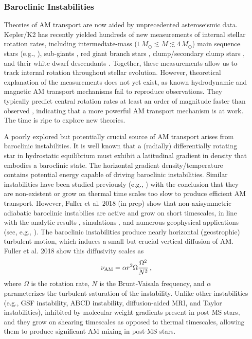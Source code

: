 \subsubsection{Baroclinic Instabilities}
\label{baroclinic}


Theories of AM transport are now aided by unprecedented asteroseismic data. Kepler/K2 has recently yielded hundreds of new measurements of internal stellar rotation rates, including intermediate-mass ($1 \, M_\odot \! \lesssim \! M \! \lesssim \! 4 \, M_\odot$) main sequence stars (e.g., \citealt{benomar:15,vanreeth:16}), sub-giants \citep{deheuvels:14}, red giant branch stars \citep{beck:12,mosser:12}, clump/secondary clump stars \citep{mosser:12,deheuvels:15}, and their white dwarf descendants \citep{hermes:17}. Together, these measurements allow us to track internal rotation throughout stellar evolution. However, theoretical explanation of the measurements does not yet exist, as known hydrodynamic and magnetic AM transport mechanisms fail to reproduce observations. They typically predict central rotation rates at least an order of magnitude faster than observed \citep{cantiello:14}, indicating that a more powerful AM transport mechanism is at work. The time is ripe to explore new theories.

A poorly explored but potentially crucial source of AM transport arises from baroclinic instabilities. It is well known that a (radially) differentially rotating star in hydrostatic equilibrium must exhibit a latitudinal gradient in density that embodies a baroclinic state. The horizontal gradient density/temperature contains potential energy capable of driving baroclinic instabilities. Similar instabilities have been studied previously (e.g., \citealt{goldreich:67,knobloch:82,knobloch:83,spruit:83,spruit:84,zahn:93}) with the conclusion that they are non-existent or grow on thermal time scales too slow to produce efficient AM transport. However, Fuller et al. 2018 (in prep) show that non-axisymmetric adiabatic baroclinic instabilies are active and grow on short timescales, in line with the analytic results \citep{tassoul:82,fujimoto:87,fujimoto:88}, simulations \cite{simitev:17}, and numerous geophysical applications (see, e.g., \citealt{pedlosky:92}). The baroclinic instabilities produce nearly horizontal (geostrophic) turbulent motion, which induces a small but crucial vertical diffusion of AM. Fuller et al. 2018 show this diffusivity scales as
\begin{equation}
\label{numri} 
\nu_{\rm AM} = \alpha r^2 \Omega \frac{\Omega^2}{N^2} \, ,
\end{equation}
where $\Omega$ is the rotation rate, $N$ is the Brunt-Vaisala frequency, and $\alpha$ parameterizes the turbulent saturation of the instability. Unlike other instabilities (e.g., GSF instability, ABCD instability, diffusion-aided MRI, and Taylor instabilities),  inhibited by molecular weight gradients present in post-MS stars, and they grow on shearing timescales as opposed to thermal timescales, allowing them to produce significant AM mixing in post-MS stars.




